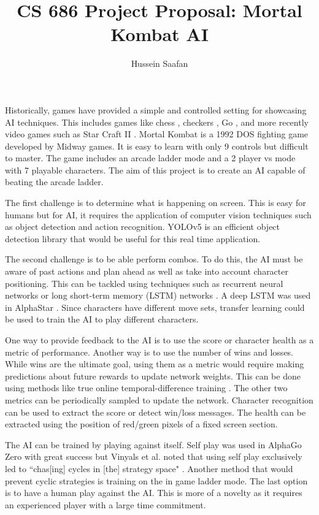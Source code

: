 \documentclass[12pt,a4paper, twocolumn]{article}
\author{Hussein Saafan}
\title{\vspace{-3cm}CS 686 Project Proposal: Mortal Kombat AI}
\begin{document}
\maketitle
Historically, games have provided a simple and controlled setting for showcasing AI techniques.
This includes games like chess \cite{hsu2002behind}, checkers \cite{schaeffer2007checkers}, Go \cite{silver2017mastering}, and more recently video games such as Star Craft II \cite{vinyals2019grandmaster}.
Mortal Kombat is a 1992 DOS fighting game developed by Midway games.
It is easy to learn with only 9 controls but difficult to master.
The game includes an arcade ladder mode and a 2 player vs mode with 7 playable characters.
The aim of this project is to create an AI capable of beating the arcade ladder.

The first challenge is to determine what is happening on screen.
This is easy for humans but for AI, it requires the application of computer vision techniques such as object detection \cite{liu2020deep} and action recognition\cite{zhang2019comprehensive}.
YOLOv5 \cite{glennjocher2022} is an efficient object detection library that would be useful for this real time application.  

The second challenge is to be able perform combos.
To do this, the AI must be aware of past actions and plan ahead as well as take into account character positioning.
This can be tackled using techniques such as recurrent neural networks or long short-term memory (LSTM) networks \cite{lipton2015critical}.
A deep LSTM was used in AlphaStar \cite{vinyals2019grandmaster}.
Since characters have different move sets, transfer learning \cite{zhuang2020comprehensive} could be used to train the AI to play different characters. 

One way to provide feedback to the AI is to use the score or character health as a metric of performance.
Another way is to use the number of wins and losses.
While wins are the ultimate goal, using them as a metric would require making predictions about future rewards to update network weights.
This can be done using methods like true online temporal-difference training \cite{van2016true}.
The other two metrics can be periodically sampled to update the network.
Character recognition \cite{islam2017survey} can be used to extract the score or detect win/loss messages.
The health can be extracted using the position of red/green pixels of a fixed screen section.

The AI can be trained by playing against itself.
Self play was used in AlphaGo Zero \cite{silver2017mastering} with great success but
Vinyals et al. noted that using self play exclusively led to ``chas[ing] cycles in [the] strategy space" \cite{vinyals2019grandmaster}.
Another method that would prevent cyclic strategies is training on the in game ladder mode.
The last option is to have a human play against the AI.
This is more of a novelty as it requires an experienced player with a large time commitment.
\end{document}
